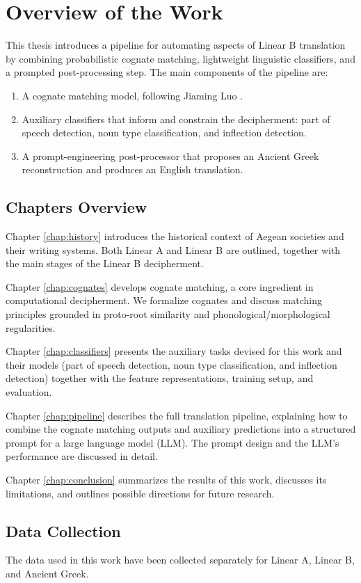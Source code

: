 \chapter{Overview of the Work}
This thesis introduces a pipeline for automating aspects of Linear B translation by combining probabilistic cognate matching, lightweight linguistic classifiers, and a prompted post-processing step.
The main components of the pipeline are:
\begin{enumerate}
    \item A cognate matching model, following Jiaming Luo \cite{luo}.
    \item Auxiliary classifiers that inform and constrain the decipherment: part of speech detection, noun type classification, and inflection detection.
    \item A prompt-engineering post-processor that proposes an Ancient Greek reconstruction and produces an English translation.
\end{enumerate}

\section{Chapters Overview}
Chapter \ref{chap:history} introduces the historical context of Aegean societies and their writing systems. Both Linear A and Linear B are outlined, together with the main stages of the Linear B decipherment.

Chapter \ref{chap:cognates} develops cognate matching, a core ingredient in computational decipherment. We formalize cognates and discuss matching principles grounded in proto-root similarity and phonological/morphological regularities.

Chapter \ref{chap:classifiers} presents the auxiliary tasks devised for this work and their models (part of speech detection, noun type classification, and inflection detection) together with the feature representations, training setup, and evaluation.

Chapter \ref{chap:pipeline} describes the full translation pipeline, explaining how to combine the cognate matching outputs and auxiliary predictions into a structured prompt for a large language model (LLM). The prompt design and the LLM's performance are discussed in detail.

Chapter \ref{chap:conclusion} summarizes the results of this work, discusses its limitations, and outlines possible directions for future research.

\section{Data Collection}
The data used in this work have been collected separately for Linear A, Linear B, and Ancient Greek.


